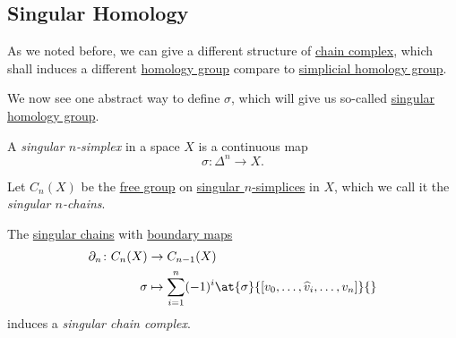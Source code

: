 \subsection{Singular Homology}
As we noted before, we can give a different structure of \hyperref[def:chain-complex]{chain complex}, which shall
induces a different \hyperref[def:homology-group]{homology group} compare to \hyperref[def:simplicial-homology-group]{simplicial homology group}.

We now see one abstract way to define \(\sigma \), which will give us so-called \hyperref[def:singular-homology-group]{singular homology group}.

\begin{definition}\label{def:singular-simplex}
	A \emph{singular \(n\)-simplex} in a space \(X\) is a continuous map
	\[
		\sigma \colon \Delta^n \to X.
	\]
\end{definition}

\begin{definition}\label{def:singular-chain}
	Let \(C_n(X)\) be the \hyperref[def:free-group]{free group} on \hyperref[def:singular-simplex]{singular \(n\)-simplices} in \(X\), which we
	call it the \emph{singular \(n\)-chains}.
\end{definition}

\begin{definition}\label{def:singular-chain-complex}
	The \hyperref[def:singular-simplex]{singular chains} with \hyperref[def:boundary-homomorphism]{boundary maps}
	\[
		\begin{split}
			\partial_n \colon C_n(X) & \to C_{n - 1}(X)                                                                       \\
			\sigma              & \mapsto \sum_{i = 1}^n (-1)^i \at{\sigma}{[v_0, \ldots, \widehat{v}_i, \ldots, v_n]}{}
		\end{split}
	\]
	induces a \emph{singular chain complex}.
\end{definition}

